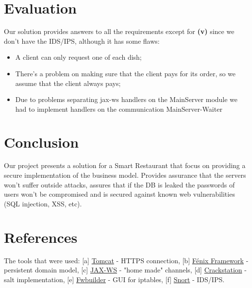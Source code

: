 \documentclass[12pt,paper=a4]{article}
\begin{document}
\section{Evaluation}
Our solution provides answers to all the requirements except for \textbf{(v)} since we don't have the IDS/IPS, although it has some flaws:
\begin{itemize}
\item A client can only request one of each dish;
\item There’s a problem on making sure that the client pays for its order, so we assume that the client always pays;
\item Due to problems separating jax-ws handlers on the MainServer module we had to implement handlers on the communication MainServer-Waiter
\end{itemize}
\section{Conclusion}
Our project presents a solution for a Smart Restaurant that focus on providing a secure implementation of the business model. Provides assurance that the servers won’t suffer outside attacks, assures that if the DB is leaked the passwords of users won’t be compromised and is secured against known web vulnerabilities (SQL injection, XSS, etc).
\section{References}
The tools that were used: [a] \href{http://tomcat.apache.org/}{Tomcat} - HTTPS connection, [b] \href{https://fenix-framework.github.io/}{Fénix Framework} - persistent domain model, [c] \href{https://jax-ws.java.net/}{JAX-WS} - "home made" channels, [d] \href{https://crackstation.net/hashing-security.htm}{Crackstation} - salt implementation, [e] \href{http://www.fwbuilder.org/}{Fwbuilder} - GUI for iptables, [f] \href{https://www.snort.org/}{Snort} - IDS/IPS.
\end{document}

